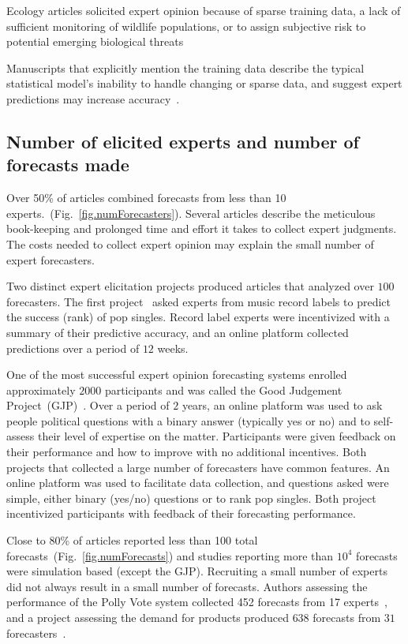 \documentclass[preprint,authoryear]{elsarticle}
\begin{document}
Ecology articles solicited expert opinion because of sparse training data, a lack of sufficient monitoring of wildlife populations, or to assign subjective risk to potential emerging biological threats~\citep{li2012preliminary,mantyka2014understanding,kurowicka2010probabilistic}

Manuscripts that explicitly mention the training data describe the typical statistical model's inability to handle changing or sparse data, and suggest expert predictions may increase accuracy~\citep{seifert2013relative,song2013combining}.

\subsection{Number of elicited experts and number of forecasts made}

Over 50\% of articles combined forecasts from less than 10 experts.~(Fig.~\ref{fig.numForecasters}).
Several articles describe the meticulous book-keeping and prolonged time and effort it takes to collect expert judgments.
The costs needed to collect expert opinion may explain the small number of expert forecasters.

Two distinct expert elicitation projects produced articles that analyzed over $100$ forecasters.
The first project~\citep{seifert2013relative} asked experts from music record labels to predict the success (rank) of pop singles.
Record label experts were incentivized with a summary of their predictive accuracy, and 
an online platform collected predictions over a period of $12$ weeks.

One of the most successful expert opinion forecasting systems enrolled approximately $2000$ participants and was called the Good Judgement Project~(GJP)~\citep{mellers2014psychological,ungar2012good,satopaa2014probability}.
Over a period of $2$ years, an online platform was used to ask people political questions with a binary answer (typically yes or no) and to self-assess their level of expertise on the matter.
Participants were given feedback on their performance and how to improve with no additional incentives.
Both projects that collected a large number of forecasters have common features.
An online platform was used to facilitate data collection, and questions asked were simple, either binary (yes/no) questions or to rank pop singles. 
Both project incentivized participants with feedback of their forecasting performance.

Close to 80\% of articles reported less than 100 total forecasts~(Fig.~\ref{fig.numForecasts}) and studies reporting more than $10^4$ forecasts were simulation based (except the GJP).
Recruiting a small number of experts did not always result in a small number of forecasts.
Authors assessing the performance of the Polly Vote system collected 452 forecasts from 17 experts~\citep{graefe2014accuracy,graefe2015accuracy,graefe2018predicting}, and
a project assessing the demand for products produced $638$ forecasts from $31$ forecasters~\citep{alvarado2017expertise}.
\end{document}
